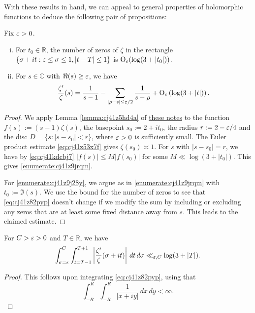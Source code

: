 \documentclass[reqno]{amsart}  \numberwithin{theorem}{section} \numberwithin{equation}{section}
\begin{document}
With these results in hand, we can appeal to general properties of holomorphic functions to deduce the following pair of propositions:
\begin{proposition}\label{proposition:cj41z9de5r}
  Fix $\varepsilon > 0$.
  \begin{enumerate}[(i)]
  \item\label{enumerate:cj41z9jrqm} For $t_0 \in \mathbb{R}$, the number of zeros of $\zeta$ in the rectangle $\{\sigma + i t: \varepsilon \leq \sigma \leq 1, \lvert t - T \rvert \leq 1\}$ is $\operatorname{O}_\varepsilon (\log (3 + \lvert t_0 \rvert))$.
  \item\label{enumerate:cj41z9j28y} For $s \in \mathbb{C}$ with $\Re(s) \geq \varepsilon$, we have
    \begin{equation}\label{eq:cj41z82pyp}
      \frac{\zeta ' }{\zeta }(s)
      =
      \frac{1}{s - 1} - \sum_{
        \lvert \rho - s \rvert \leq \varepsilon/2
      }
      \frac{1}{s - \rho } + \operatorname{O}_{\varepsilon } \left( \log (3 + \lvert t \rvert) \right).
    \end{equation}
  \end{enumerate}
\end{proposition}
\begin{proof}
  We apply Lemma \ref{lemma:cj41z5hd4a} of \href{20230907T143521--complex-analysis-preliminaries.pdf}{these notes} to the function $f(s) := (s - 1) \zeta(s)$, the basepoint $s_0 := 2 + i t_0$, the radius $r := 2 - \varepsilon/4$ and the disc $D = \{s : \lvert s - s_0 \rvert < r\}$, where $\varepsilon > 0$ is sufficiently small.  The Euler product estimate \eqref{eq:cj41z53x7f} gives $\zeta(s_0) \asymp 1$. For $s$ with $\lvert s - s_0\rvert = r$, we have by \eqref{eq:cj41kdcbj7} $\lvert f(s) \rvert \leq M \lvert f(s_0) \rvert$ for some $M \ll \log(3 + \lvert t_0 \rvert)$.  This gives \eqref{enumerate:cj41z9jrqm}.

  For \eqref{enumerate:cj41z9j28y}, we argue as in \eqref{enumerate:cj41z9jrqm} with $t_0 := \Im(s)$.  We use the bound for the number of zeros to see that \eqref{eq:cj41z82pyp} doesn't change if we modify the sum by including or excluding any zeros that are at least some fixed distance away from $s$.  This leads to the claimed estimate.
\end{proof}

\begin{lemma}\label{lemma:cj42xpd5qe}
  For $C > \varepsilon > 0$ and $T \in \mathbb{R}$, we have
  \begin{equation*}
    \int_{\sigma = \varepsilon }^{C}
    \int_{t = T-1}^{T+1}
    \left\lvert
      \frac{\zeta ' }{\zeta }(\sigma + i t)
    \right\rvert
    \, d t
    \, d \sigma
    \ll_{\varepsilon,C} \log (3 + \lvert T \rvert).
  \end{equation*}
\end{lemma}
\begin{proof}
  This follows upon integrating \eqref{eq:cj41z82pyp}, using that
  \begin{equation*}
    \int_{-R}^R
    \int_{-R}^R
    \frac{1}{\lvert x + i y \rvert} \, d x \, d y < \infty.
  \end{equation*}  
\end{proof}
\end{document}
